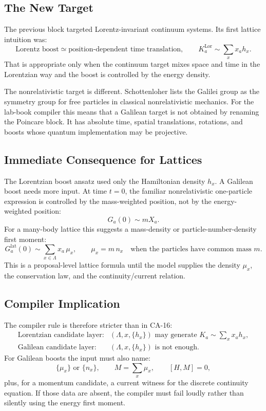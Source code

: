 \subsection{The New Target}

The previous block targeted Lorentz-invariant continuum systems.  Its first
lattice intuition was:
\[
  \text{Lorentz boost} \simeq \text{position-dependent time translation},
  \qquad
  K^{\mathrm{Lor}}_a\sim\sum_x x_a h_x.
\]
That is appropriate only when the continuum target mixes space and time in the
Lorentzian way and the boost is controlled by the energy density.

The nonrelativistic target is different.  Schottenloher lists the Galilei group
as the symmetry group for free particles in classical nonrelativistic mechanics.
For the lab-book compiler this means that a Galilean target is not obtained by
renaming the Poincare block.  It has absolute time, spatial translations,
rotations, and boosts whose quantum implementation may be projective.

\subsection{Immediate Consequence for Lattices}

The Lorentzian boost ansatz used only the Hamiltonian density \(h_x\).  A
Galilean boost needs more input.  At time \(t=0\), the familiar nonrelativistic
one-particle expression is controlled by the mass-weighted position, not by the
energy-weighted position:
\[
  G_a(0)\sim mX_a.
\]
For a many-body lattice this suggests a mass-density or particle-number-density
first moment:
\[
  G_a^{\mathrm{lat}}(0)
  \sim
  \sum_{x\in\Lambda} x_a\,\mu_x,
  \qquad
  \mu_x = m\,n_x
  \quad\text{when the particles have common mass }m.
\]
This is a proposal-level lattice formula until the model supplies the density
\(\mu_x\), the conservation law, and the continuity/current relation.

\subsection{Compiler Implication}

The compiler rule is therefore stricter than in CA-16:
\[
\begin{array}{ll}
\text{Lorentzian candidate layer:}
  &(\Lambda,x,\{h_x\})\text{ may generate }K_a\sim\sum_x x_a h_x,\\[2mm]
\text{Galilean candidate layer:}
  &(\Lambda,x,\{h_x\})\text{ is not enough.}
\end{array}
\]
For Galilean boosts the input must also name:
\[
  \{\mu_x\}\text{ or }\{n_x\},\qquad
  M=\sum_x\mu_x,\qquad
  [H,M]=0,
\]
plus, for a momentum candidate, a current witness for the discrete continuity
equation.  If those data are absent, the compiler must fail loudly rather than
silently using the energy first moment.


